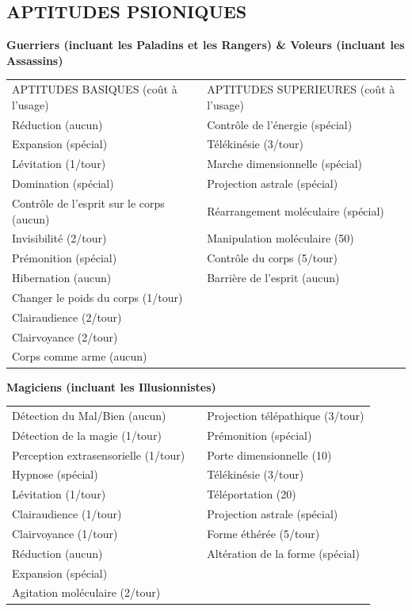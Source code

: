 {\newpage
\subsection*{\normalsize APTITUDES PSIONIQUES}

\textbf{Guerriers (incluant les Paladins et les Rangers) \& Voleurs (incluant les Assassins)}

\bigskip

\begin{tabular}{p{7.5cm}p{0.3cm}p{7.5cm}}
APTITUDES BASIQUES (coût à l'usage) && APTITUDES SUPERIEURES (coût à l'usage) \\
Réduction (aucun) && Contrôle de l'énergie (spécial) \\
Expansion (spécial) && Télékinésie (3/tour) \\
Lévitation (1/tour) && Marche dimensionnelle (spécial) \\
Domination (spécial) && Projection astrale (spécial) \\
Contrôle de l'esprit sur le corps (aucun) && Réarrangement moléculaire (spécial) \\
Invisibilité (2/tour) && Manipulation moléculaire (50) \\
Prémonition (spécial) && Contrôle du corps (5/tour) \\
Hibernation (aucun) && Barrière de l'esprit (aucun) \\
Changer le poids du corps (1/tour) && \\
Clairaudience (2/tour) && \\
Clairvoyance (2/tour) && \\
Corps comme arme (aucun) && \\
\end{tabular}

\bigskip

\textbf{Magiciens (incluant les Illusionnistes)}

\bigskip

\begin{tabular}{p{7.5cm}p{0.3cm}p{7.5cm}}
Détection du Mal/Bien (aucun) && Projection télépathique (3/tour) \\
Détection de la magie (1/tour) && Prémonition (spécial) \\
Perception extrasensorielle (1/tour) && Porte dimensionnelle (10) \\
Hypnose (spécial) && Télékinésie (3/tour) \\
Lévitation (1/tour) && Téléportation (20) \\
Clairaudience (1/tour) && Projection astrale (spécial) \\
Clairvoyance (1/tour) && Forme éthérée (5/tour) \\
Réduction (aucun) && Altération de la forme (spécial) \\
Expansion (spécial) && \\
Agitation moléculaire (2/tour) && \\
\end{tabular}

}
